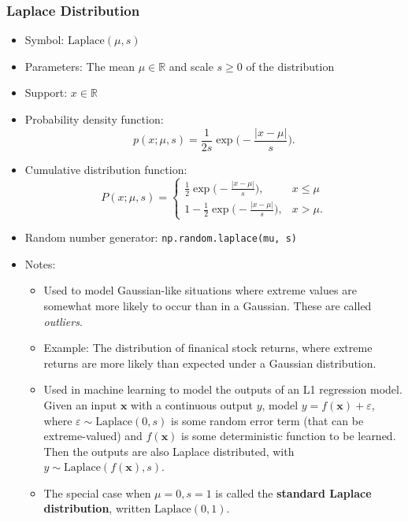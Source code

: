 \documentclass[
  letterpaper,
  DIV=11,
  numbers=noendperiod]{scrreprt}
\providecommand{\tightlist}{%
  \setlength{\itemsep}{0pt}\setlength{\parskip}{0pt}}\usepackage{longtable,booktabs,array}
\begin{document}
\hypertarget{laplace-distribution}{%
\subsubsection{Laplace Distribution}\label{laplace-distribution}}

\begin{itemize}
\tightlist
\item
  Symbol: \(\text{Laplace}(\mu, s)\)
\item
  Parameters: The mean \(\mu \in \mathbb{R}\) and scale \(s \geq 0\) of
  the distribution
\item
  Support: \(x \in \mathbb{R}\)
\item
  Probability density function:
  \[p(x; \mu , s) = \frac{1}{2s} \exp\bigg(-\frac{|x-\mu|}{s}\bigg).\]
\item
  Cumulative distribution function: \[
  P(x; \mu , s) =
  \begin{cases}
  \frac{1}{2} \exp\bigg(-\frac{|x-\mu|}{s}\bigg), & x \leq \mu \\
  1 - \frac{1}{2} \exp\bigg(-\frac{|x-\mu|}{s}\bigg), & x > \mu.
  \end{cases}
  \]
\item
  Random number generator: \texttt{np.random.laplace(mu,\ s)}
\item
  Notes:

  \begin{itemize}
  \tightlist
  \item
    Used to model Gaussian-like situations where extreme values are
    somewhat more likely to occur than in a Gaussian. These are called
    \emph{outliers}.
  \item
    Example: The distribution of finanical stock returns, where extreme
    returns are more likely than expected under a Gaussian distribution.
  \item
    Used in machine learning to model the outputs of an L1 regression
    model. Given an input \(\mathbf{x}\) with a continuous output \(y\),
    model \(y = f(\mathbf{x}) + \varepsilon\), where
    \(\varepsilon \sim \text{Laplace}(0, s)\) is some random error term
    (that can be extreme-valued) and \(f(\mathbf{x})\) is some
    deterministic function to be learned. Then the outputs are also
    Laplace distributed, with
    \(y \sim \text{Laplace}(f(\mathbf{x}), s)\).
  \item
    The special case when \(\mu=0, s=1\) is called the \textbf{standard
    Laplace distribution}, written \(\text{Laplace}(0, 1)\).
  \end{itemize}
\end{itemize}
\end{document}
